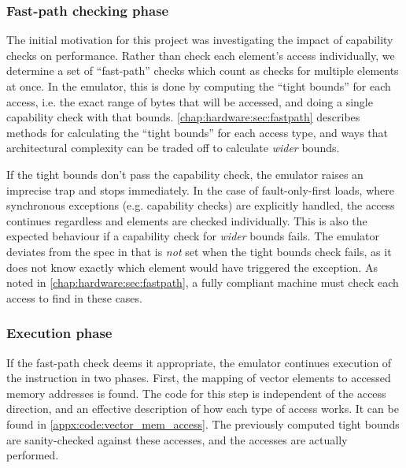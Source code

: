 \subsubsection{Fast-path checking phase}\label{chap:hardware:subsec:checking}
The initial motivation for this project was investigating the impact of capability checks on performance.
Rather than check each element's access individually, we determine a set of \enquote{fast-path} checks which count as checks for multiple elements at once.
In the emulator, this is done by computing the \enquote{tight bounds} for each access, i.e. the exact range of bytes that will be accessed, and doing a single capability check with that bounds.
\cref{chap:hardware:sec:fastpath} describes methods for calculating the \enquote{tight bounds} for each access type, and ways that architectural complexity can be traded off to calculate \emph{wider} bounds.


If the tight bounds don't pass the capability check, the emulator raises an imprecise trap and stops immediately.
In the case of fault-only-first loads, where synchronous exceptions (e.g. capability checks) are explicitly handled, the access continues regardless and elements are checked individually.
This is also the expected behaviour if a capability check for \emph{wider} bounds fails.
The emulator deviates from the spec in that  is \emph{not} set when the tight bounds check fails, as it does not know exactly which element would have triggered the exception.
As noted in \cref{chap:hardware:sec:fastpath}, a fully compliant machine must check each access to find  in these cases.

\subsubsection{Execution phase}\label{chap:hardware:subsec:execution}
If the fast-path check deems it appropriate, the emulator continues execution of the instruction in two phases.
First, the mapping of vector elements to accessed memory addresses is found.
The code for this step is independent of the access direction, and an effective description of how each type of access works.
It can be found in \cref{appx:code:vector_mem_access}.
The previously computed tight bounds are sanity-checked against these accesses, and the accesses are actually performed.

